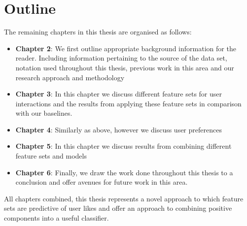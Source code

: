 \section{Outline}
\label{sec:outline}

The remaining chapters in this thesis are organised as follows:
\begin{itemize}
\item \textbf{Chapter 2}: We first outline appropriate background information for the reader. Including information pertaining to the source of 
the data set, notation used throughout this thesis, previous work in this area and our research approach and methodology
\item \textbf{Chapter 3}: In this chapter we discuss different feature sets for user interactions and the results from applying these feature sets 
in comparison with our baselines.
\item \textbf{Chapter 4}: Similarly as above, however we discuss user preferences
\item \textbf{Chapter 5}: In this chapter we discuss results from combining different feature sets and models
\item \textbf{Chapter 6}: Finally, we draw the work done throughout this thesis to a conclusion and offer avenues for future work in this area.
\end{itemize}

All chapters combined, this thesis represents a novel approach to which feature sets are predictive of user likes and offer an approach to 
combining positive components into a useful classifier.

